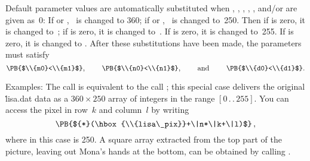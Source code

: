 Default parameter values are automatically substituted when , , ,
, , and/or  are given as~0: If  or ,
~is changed to 360; if  or , ~is
changed to~250. Then if  is zero, it is changed
to~; if  is zero, it is changed to~.
If  is zero, it is changed to~255.
If  is zero, it is changed to .
After these substitutions have been made, the parameters must satisfy
$$\hbox{\PB{$\\{m0}<\\{m1}$}, \qquad\PB{$\\{n0}<\\{n1}$}, \qquad and \qquad %
\PB{$\\{d0}<\\{d1}$}.}$$

Examples: The call 
is equivalent to the call
;
this special case delivers the original \.{lisa.dat} data as a
$360\times250$ array of integers in the range $[0\,.\,.\,255]$. You
can access the pixel in row~$k$ and column~$l$ by writing
$$\hbox{\PB{${*}(\hbox{\\{lisa\_pix}}+\|n*\|k+\|l)$}}\,,$$ where  in
this case is
250. A square array extracted from the top part of the picture,
leaving out Mona's hands at the bottom, can be obtained by calling
.

